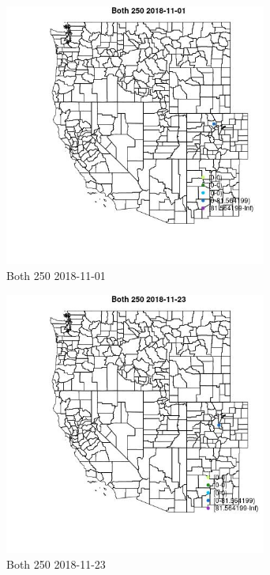 \begin{figure} 
\centering  
\includegraphics[width=0.77\textwidth]{Code_Outputs/Report_ML_input_PM25_Step4_part_e_de_duplicated_aves_MapObsBoth_2502018-11-01.jpg} 
\caption{\label{fig:Report_ML_input_PM25_Step4_part_e_de_duplicated_avesMapObsBoth_2502018-11-01}Both 250 2018-11-01} 
\end{figure} 
 

\begin{figure} 
\centering  
\includegraphics[width=0.77\textwidth]{Code_Outputs/Report_ML_input_PM25_Step4_part_e_de_duplicated_aves_MapObsBoth_2502018-11-23.jpg} 
\caption{\label{fig:Report_ML_input_PM25_Step4_part_e_de_duplicated_avesMapObsBoth_2502018-11-23}Both 250 2018-11-23} 
\end{figure} 
 

